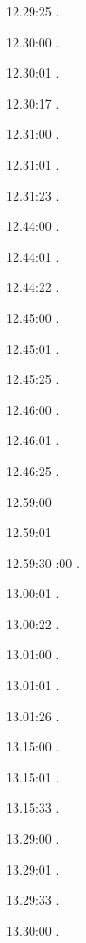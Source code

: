 \documentclass[italian]{article}
\begin{document}
12.29:25    .

12.30:00    .

12.30:01    .

12.30:17    .

12.31:00    .

12.31:01    .

12.31:23    .

12.44:00    .

12.44:01    .

12.44:22    .

12.45:00    .

12.45:01    .

12.45:25    .

12.46:00    .

12.46:01    .

12.46:25    .

12.59:00    

12.59:01    

12.59:30    
:00    . 

13.00:01    . 

13.00:22    . 

13.01:00     . 

13.01:01     . 

13.01:26     . 

13.15:00     . 

13.15:01     .

13.15:33     .

13.29:00     . 

13.29:01     . 

13.29:33     . 

13.30:00     .
\end{document}
